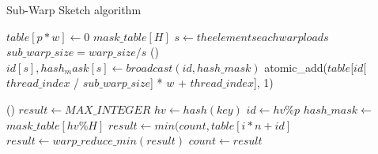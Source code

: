 \documentclass[conference]{IEEEtran}
\begin{document}
\begin{algorithm}
    \DontPrintSemicolon
    \caption{Sub-Warp Sketch algorithm}
    $table[p * w] \longleftarrow 0$\;
    $mask\_table[H]$\;
    $s \longleftarrow the elements each warp loads$\;
    $sub\_warp\_size = warp\_size / s $\;
\Fn(){}
{
    {
            $id[s], hash_mask[s] \leftarrow broadcast(id, hash\_mask)$\;
            {
                {
                    atomic\_add($table$[$id$[$thread\_index$ / $sub\_warp\_size$] * $w$ + $thread\_index$], 1)
                }
            }
    }
}

\Fn(){}
{%
    {
        $result \leftarrow MAX\_INTEGER$\;
            $hv \leftarrow hash(key)$\;
            $id \leftarrow hv \% p$
            $hash\_mask \leftarrow$ $mask\_table[hv \% H]$
            {
                {
                    $result \leftarrow min(count, table[i * n + id]$
                }
            }
        $result \leftarrow warp\_reduce\_min(result)$\;
        {
            $count \leftarrow result$
        }
    }
}

\end{algorithm}
\end{document}
